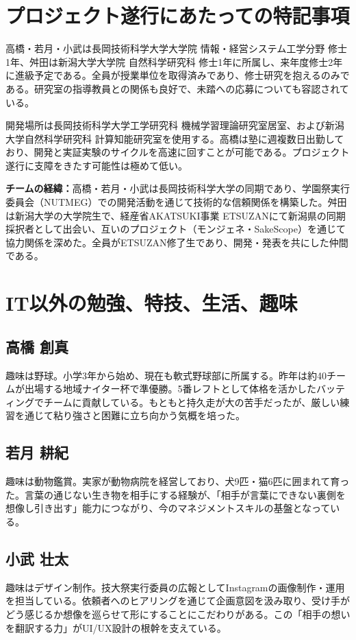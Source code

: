 \documentclass[paper=a4,fontsize=10.5bp,jafontsize=10.5bp,twocolumn]{jlreq}
\begin{document}
\section{プロジェクト遂行にあたっての特記事項}

高橋・若月・小武は長岡技術科学大学大学院 情報・経営システム工学分野 修士1年、舛田は新潟大学大学院 自然科学研究科 修士1年に所属し、来年度修士2年に進級予定である。全員が授業単位を取得済みであり、修士研究を抱えるのみである。研究室の指導教員との関係も良好で、未踏への応募についても容認されている。

開発場所は長岡技術科学大学工学研究科 機械学習理論研究室居室、および新潟大学自然科学研究科 計算知能研究室を使用する。高橋は塾に週複数日出勤しており、開発と実証実験のサイクルを高速に回すことが可能である。プロジェクト遂行に支障をきたす可能性は極めて低い。

\noindent\textbf{チームの経緯：}高橋・若月・小武は長岡技術科学大学の同期であり、学園祭実行委員会（NUTMEG）での開発活動を通じて技術的な信頼関係を構築した。舛田は新潟大学の大学院生で、経産省AKATSUKI事業 ETSUZANにて新潟県の同期採択者として出会い、互いのプロジェクト（モンジェネ・SakeScope）を通じて協力関係を深めた。全員がETSUZAN修了生であり、開発・発表を共にした仲間である。

\section{IT以外の勉強、特技、生活、趣味}

\subsection*{高橋 創真}
趣味は野球。小学3年から始め、現在も軟式野球部に所属する。昨年は約40チームが出場する地域ナイター杯で準優勝。5番レフトとして体格を活かしたバッティングでチームに貢献している。もともと持久走が大の苦手だったが、厳しい練習を通じて粘り強さと困難に立ち向かう気概を培った。

\subsection*{若月 耕紀}
趣味は動物鑑賞。実家が動物病院を経営しており、犬9匹・猫6匹に囲まれて育った。言葉の通じない生き物を相手にする経験が、「相手が言葉にできない裏側を想像し引き出す」能力につながり、今のマネジメントスキルの基盤となっている。

\subsection*{小武 壮太}
趣味はデザイン制作。技大祭実行委員の広報としてInstagramの画像制作・運用を担当している。依頼者へのヒアリングを通じて企画意図を汲み取り、受け手がどう感じるか想像を巡らせて形にすることにこだわりがある。この「相手の想いを翻訳する力」がUI/UX設計の根幹を支えている。
\end{document}
